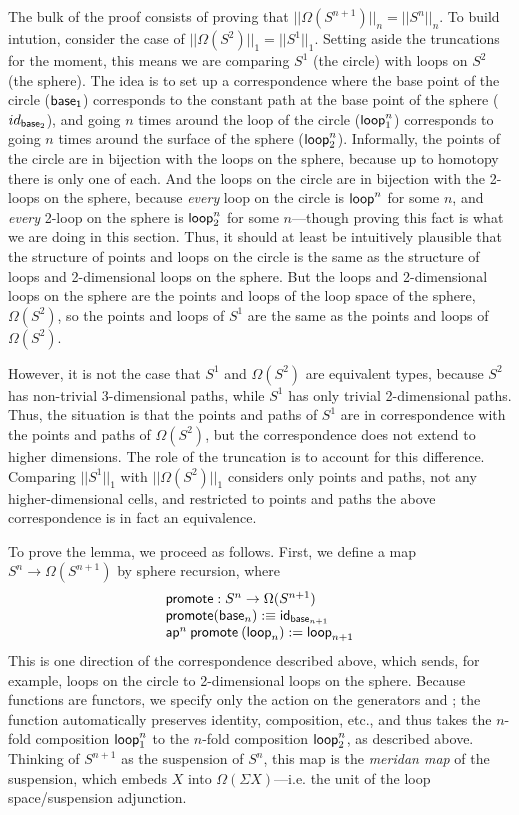 The bulk of the proof consists of proving that $||\Omega(S^{n+1})||_n =
||S^{n}||_n$.  To build intution, consider the case of
$||\Omega(S^2)||_1 = ||S^1||_1$.  Setting aside the truncations for the
moment, this means we are comparing $S^1$ (the circle) with loops on
$S^2$ (the sphere).  The idea is to set up a correspondence where the
base point of the circle ($\mathsf{base_1}$) corresponds to the constant
path at the base point of the sphere ($id_{\mathsf{base}_2}$), and going
$n$ times around the loop of the circle ($\mathsf{loop}_1^n$) corresponds
to going $n$ times around the surface of the sphere ($\mathsf{loop}_2^n$).
Informally, the points of the circle are in bijection with the loops on
the sphere, because up to homotopy there is only one of each.  And the
loops on the circle are in bijection with the 2-loops on the sphere,
because \emph{every} loop on the circle is $\mathsf{loop}^n$ for some $n$,
and \emph{every} 2-loop on the sphere is $\mathsf{loop}_2^n$ for some
$n$---though proving this fact is what we are doing in this section.
Thus, it should at least be intuitively plausible that the structure of
points and loops on the circle is the same as the structure of loops and
2-dimensional loops on the sphere.  But the loops and 2-dimensional
loops on the sphere are the points and loops of the loop space of the
sphere, $\Omega(S^2)$, so the points and loops of $S^1$ are the same as
the points and loops of $\Omega(S^2)$.

However, it is not the case that $S^1$ and $\Omega(S^2)$ are equivalent
types, because $S^2$ has non-trivial 3-dimensional paths, while $S^1$
has only trivial 2-dimensional paths.  Thus, the situation is that the
points and paths of $S^1$ are in correspondence with the points and
paths of $\Omega(S^2)$, but the correspondence does not extend to higher
dimensions.  The role of the truncation is to account for this
difference.  Comparing $||S^1||_1$ with $||\Omega(S^2)||_1$ considers
only points and paths, not any higher-dimensional cells, and restricted
to points and paths the above correspondence is in fact an equivalence.

To prove the lemma, we proceed as follows.  First, we define a map $S^n \to
\Omega(S^{n+1})$ by sphere recursion, where 
\[
\begin{array}{l}
\mathsf{promote} : S^n \to \Omega(S^{n+1}) \\
\mathsf{promote}(\mathsf{base}_n) :\equiv \mathsf{id}_{\mathsf{base}_{n+1}} \\
\mathsf{ap}^n \: \mathsf{promote} \: (\mathsf{loop}_n) := \mathsf{loop}_{n+1}
\end{array}
\]
This is one direction of the correspondence described above, which
sends, for example, loops on the circle to 2-dimensional loops on the
sphere.  Because functions are functors, we specify only the action on
the generators  and ; the function automatically
preserves identity, composition, etc., and thus takes the $n$-fold
composition $\mathsf{loop}_1^n$ to the $n$-fold composition
$\mathsf{loop}_2^n$, as described above.  Thinking of $S^{n+1}$ as the
suspension of $S^n$, this map is the \emph{meridan map} of the
suspension, which embeds $X$ into $\Omega(\Sigma X)$---i.e. the unit of
the loop space/suspension adjunction.  

